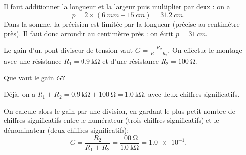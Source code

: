 \begin{corrige}
Il faut additionner la longueur et la largeur puis multiplier par deux : on a
\[
p=2\times(\SI{6}{mm}+\SI{15}{cm})=\SI{31.2}{cm}.
\]
Dans la somme, la précision est limitée par la longueur (précise au centimètre près). Il faut donc arrondir au centimètre près : on écrit $p=\SI{31}{cm}$.
\end{corrige}



\pauseEntrainement


\medskip

  Le gain d'un pont diviseur de tension vaut $G=\frac{R_2}{R_1+R_2}$.
  On effectue le montage avec une résistance $R_1=\SI{0,9}{\kilo\ohm}$ et d'une résistance $R_2=\SI{100}{\ohm}$. 	
  

\minusMedskip

\repriseEntrainement




\begin{enonce}
Que vaut le gain $G$?
\end{enonce}


\begin{corrige}
Déjà, on a $R_1+R_2=\SI{0,9}{\kilo\ohm}+\SI{100}{\ohm}=\SI{1,0}{\kilo\ohm}$, avec deux chiffres significatifs.

On calcule alors le gain par une division, en gardant le plus petit nombre de chiffres significatifs entre le numérateur (trois chiffres significatifs) et le dénominateur (deux chiffres significatifs):
\[
  G=\frac{R_2}{R_1+R_2}=\frac{\SI{100}{\ohm}}{\SI{1,0}{\kilo\ohm}}=\num{1,0e-1}.
\]
\end{corrige}


\finEntrainement







